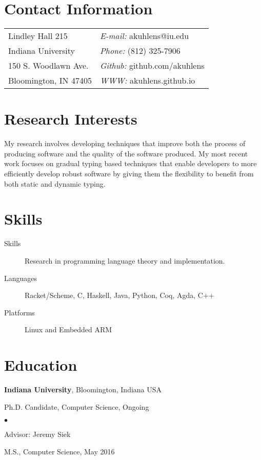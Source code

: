\documentclass[margin,line]{res}
\newenvironment{list1}{
  \begin{list}{\ding{113}}{%
      \setlength{\itemsep}{0in}
      \setlength{\parsep}{0in} \setlength{\parskip}{0in}
      \setlength{\topsep}{0in} \setlength{\partopsep}{0in} 
      \setlength{\leftmargin}{0.17in}}}{\end{list}}
\newenvironment{list2}{
  \begin{list}{$\bullet$}{%
      \setlength{\itemsep}{0in}
      \setlength{\parsep}{0in} \setlength{\parskip}{0in}
      \setlength{\topsep}{0in} \setlength{\partopsep}{0in} 
      \setlength{\leftmargin}{0.2in}}}{\end{list}}
\begin{document}

\begin{resume}
\section{\sc Contact Information}
\vspace{.05in}
\begin{tabular}{@{}p{2in}p{4in}}
Lindley Hall 215           & {\it E-mail:} akuhlens@iu.edu \\
Indiana University         & {\it Phone:}  (812) 325-7906 \\
150 S. Woodlawn Ave.       & {\it Github:} github.com/akuhlens  \\       
Bloomington, IN 47405      & {\it WWW:} akuhlens.github.io \\     
\end{tabular}

\section{\sc Research Interests}
My research involves developing techniques that improve both the
process of producing software and the quality of the software
produced. My most recent work focuses on gradual typing based
techniques that enable developers to more efficiently develop robust
software by giving them the flexibility to benefit from both static
and dynamic typing.

\section{\sc Skills}

\begin{description}
\item[Skills] Research in programming language theory and implementation.
\item[Languages] Racket/Scheme, C, Haskell, Java, Python, Coq, Agda, C++
\item[Platforms] Linux and Embedded ARM
\end{description}
\section{\sc Education}
{\bf Indiana University}, Bloomington, Indiana USA\\
\vspace*{-.1in}
\begin{list1}
\item[] Ph.D. Candidate, Computer Science, Ongoing
\begin{list2}
\item[] Advisor:  Jeremy Siek
\end{list2}
\vspace*{.05in}
\item[] M.S., Computer Science,  May 2016
\end{list1}


\end{resume}
\end{document}
